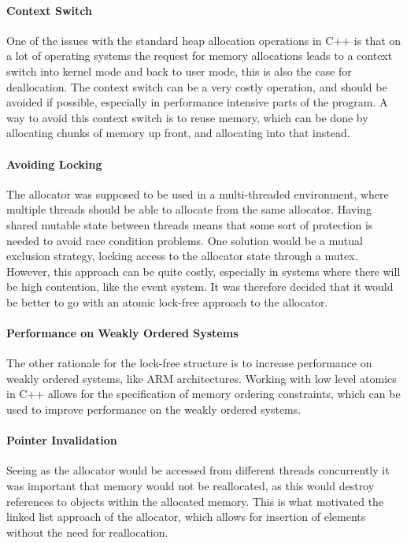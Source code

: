 \paragraph{Context Switch}
One of the issues with the standard heap allocation operations in C++ is that
on a lot of operating systems the request for memory allocations leads to a context switch into
kernel mode and back to user mode, this is also the case for deallocation.
The context switch can be a very costly operation, and should be avoided
if possible, especially in performance intensive parts of the program\cite[p. 240]{game_engine_architecture}.
A way to avoid this context switch is to reuse memory, which can be done by allocating
chunks of memory up front, and allocating into that instead.

\paragraph{Avoiding Locking}
The allocator was supposed to be used in a multi-threaded environment, where multiple threads
should be able to allocate from the same allocator.
Having shared mutable state between threads means that some sort of protection is needed
to avoid race condition problems.
One solution would be a mutual exclusion strategy, locking access to the allocator state through a mutex.
However, this approach can be quite costly, especially in systems where there will be high contention,
like the event system.
It was therefore decided that it would be better to go with an atomic lock-free approach to the allocator.

\paragraph{Performance on Weakly Ordered Systems}
The other rationale for the lock-free structure is to increase performance on weakly ordered systems,
like ARM architectures. 
Working with low level atomics in C++ allows for the specification of memory ordering constraints,
which can be used to improve performance on the weakly ordered systems.

\paragraph{Pointer Invalidation}
Seeing as the allocator would be accessed from different threads concurrently it was important that
memory would not be reallocated, as this would destroy references to objects within the allocated memory.
This is what motivated the linked list approach of the allocator, which allows for insertion of elements without
the need for reallocation.

